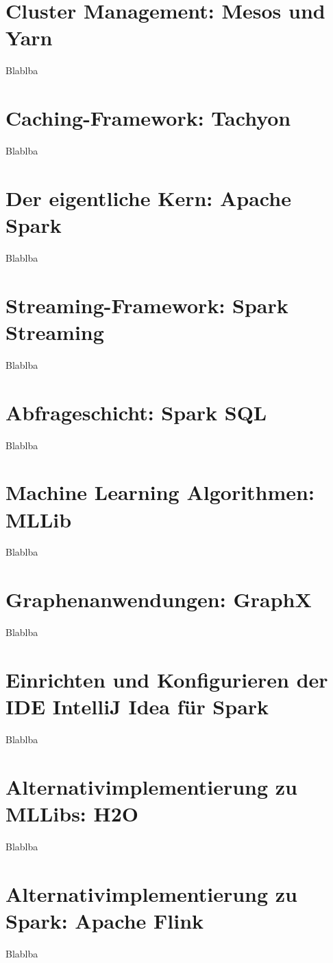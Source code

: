   

\section{Cluster Management: Mesos und Yarn }
\label{section:mesos}

Blablba

\section{Caching-Framework: Tachyon}
\label{section:tachyon}

Blablba

\section{Der eigentliche Kern: Apache Spark}
\label{section:kern}

Blablba

\section{Streaming-Framework: Spark Streaming}
\label{section:streaming}

Blablba

\section{Abfrageschicht: Spark SQL}
\label{section:spark sql}

Blablba

\section{Machine Learning Algorithmen: MLLib}
\label{section:mllib arch}

Blablba



\section{Graphenanwendungen: GraphX}
\label{section:graphx}

Blablba

\section{Einrichten und Konfigurieren der IDE IntelliJ Idea für Spark}
\label{section:intellij}

Blablba

\section{Alternativimplementierung zu MLLibs: H2O}
\label{section:h2o}

Blablba

\section{Alternativimplementierung zu Spark: Apache Flink}
\label{section:h2o}

Blablba

